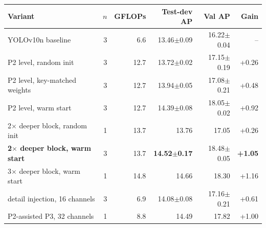 \begin{tabular}{lrrrrr}
\toprule
Variant & $n$ & GFLOPs & Test-dev AP & Val AP & Gain \\
\midrule
YOLOv10n baseline & 3 & 6.6 & 13.46$\pm$0.09 & 16.22$\pm$0.04 & -- \\
\midrule
P2 level, random init & 3 & 12.7 & 13.72$\pm$0.02 & 17.15$\pm$0.19 & +0.26 \\
P2 level, key-matched weights & 3 & 12.7 & 13.94$\pm$0.05 & 17.08$\pm$0.21 & +0.48 \\
P2 level, warm start & 3 & 12.7 & 14.39$\pm$0.08 & 18.05$\pm$0.02 & +0.92 \\
\midrule
2$\times$ deeper block, random init & 1 & 13.7 & 13.76 & 17.05 & +0.26 \\
\textbf{2$\times$ deeper block, warm start} & 3 & 13.7 & \textbf{14.52$\pm$0.17} & 18.48$\pm$0.05 & \textbf{+1.05} \\
3$\times$ deeper block, warm start & 1 & 14.8 & 14.66 & 18.30 & +1.16 \\
\midrule
detail injection, 16 channels & 3 & 6.9 & 14.08$\pm$0.08 & 17.16$\pm$0.21 & +0.61 \\
\midrule
P2-assisted P3, 32 channels & 1 & 8.8 & 14.49 & 17.82 & +1.00 \\
\bottomrule
\end{tabular}